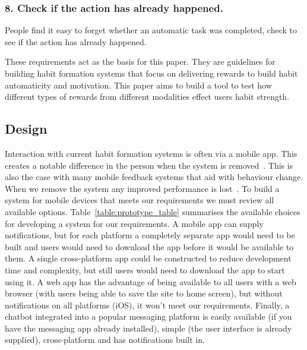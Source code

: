 \documentclass{scaffold/sigchi}
\begin{document}
\subsubsection*{8. Check if the action has already happened.}
People find it easy to forget whether an automatic task was completed, check to see if the action has already happened.

These requirements act as the basis for this paper. They are guidelines for building habit formation systems that focus on delivering rewards to build habit automaticity and motivation. This paper aims to build a tool to test how different types of rewards from different modalities effect users habit strength.

\subsection{Design}
Interaction with current habit formation systems is often via a mobile app. This creates a notable difference in the person when the system is removed~\cite{article_my_phone_is_part_of_my_soul}.
This is also the case with many mobile feedback systems that aid with behaviour change.
When we remove the system any improved performance is lost~\cite{article_dont_kick_habit, article_realtime_feedback_improving_medication_taking}. To build a system for mobile devices that meets our requirements we must review all available options.\newline
\newline
Table~\ref{table:prototype_table} summarises the available choices for developing a system for our requirements. A mobile app can supply notifications, but for each platform a completely separate app would need to be built and users would need to download the app before it would be available to them.\newline
A single cross-platform app could be constructed to reduce development time and complexity, but still users would need to download the app to start using it.\newline
A web app has the advantage of being available to all users with a web browser (with users being able to save the site to home screen), but without notifications on all platforms (iOS), it won't meet our requirements.\newline
Finally, a chatbot integrated into a popular messaging platform is easily available (if you have the messaging app already installed), simple (the user interface is already supplied), cross-platform and has notifications built in.
\end{document}
